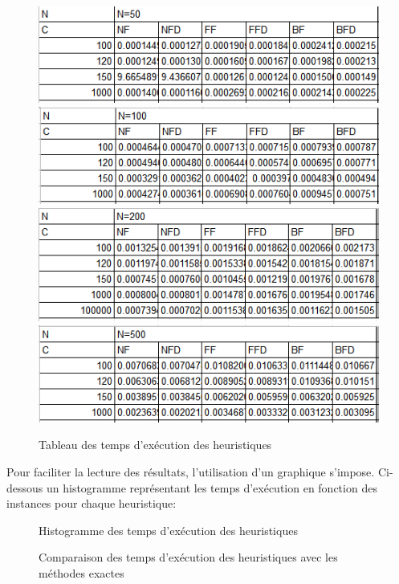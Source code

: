 \documentclass[class=article, crop=false]{standalone}
\begin{document}
\begin{figure}[H]
    \includegraphics[width=\linewidth]{../figures/tab_part1.png}
    \includegraphics[width=\linewidth]{../figures/tab_part2.png}
    \includegraphics[width=\linewidth]{../figures/tab_part3.png}
    \includegraphics[width=\linewidth]{../figures/tab_part4.png}
    \caption{Tableau des temps d'exécution des heuristiques}

\end{figure}

Pour faciliter la lecture des résultats, l’utilisation d’un graphique s’impose. Ci-dessous un histogramme représentant les temps d’exécution en fonction des instances pour chaque heuristique:
\begin{figure}[H] 
    \caption{Histogramme des temps d'exécution des heuristiques}
\end{figure}

\begin{figure}[H] 
    \caption{Comparaison des temps d'exécution des heuristiques avec les méthodes exactes}
\end{figure}
\end{document}

